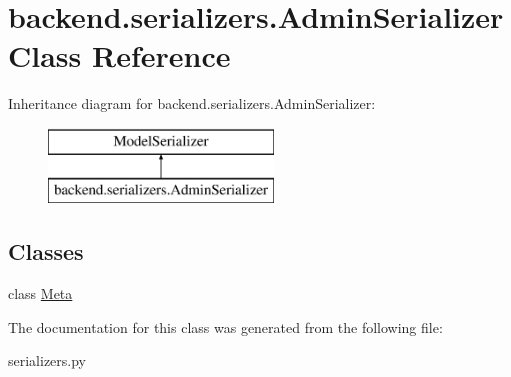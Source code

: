 \hypertarget{classbackend_1_1serializers_1_1_admin_serializer}{}\section{backend.\+serializers.\+Admin\+Serializer Class Reference}
\label{classbackend_1_1serializers_1_1_admin_serializer}
Inheritance diagram for backend.\+serializers.\+Admin\+Serializer\+:\begin{figure}[H]
\begin{center}
\leavevmode
\includegraphics[height=2.000000cm]{classbackend_1_1serializers_1_1_admin_serializer}
\end{center}
\end{figure}
\subsection*{Classes}
\begin{DoxyCompactItemize}
\item 
class \hyperlink{classbackend_1_1serializers_1_1_admin_serializer_1_1_meta}{Meta}
\end{DoxyCompactItemize}


The documentation for this class was generated from the following file\+:\begin{DoxyCompactItemize}
\item 
serializers.\+py\end{DoxyCompactItemize}
